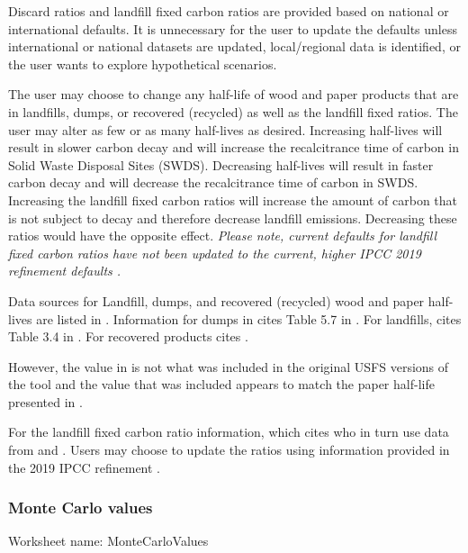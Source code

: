 \documentclass[
  openany]{book}
\begin{document}
Discard ratios and landfill fixed carbon ratios are provided based on national or international defaults. It is unnecessary for the user to update the defaults unless international or national datasets are updated, local/regional data is identified, or the user wants to explore hypothetical scenarios.

The user may choose to change any half-life of wood and paper products that are in landfills, dumps, or recovered (recycled) as well as the landfill fixed ratios. The user may alter as few or as many half-lives as desired. Increasing half-lives will result in slower carbon decay and will increase the recalcitrance time of carbon in Solid Waste Disposal Sites (SWDS). Decreasing half-lives will result in faster carbon decay and will decrease the recalcitrance time of carbon in SWDS. Increasing the landfill fixed carbon ratios will increase the amount of carbon that is not subject to decay and therefore decrease landfill emissions. Decreasing these ratios would have the opposite effect. \emph{Please note, current defaults for landfill fixed carbon ratios have not been updated to the current, higher IPCC 2019 refinement defaults \autocite{buendia2019}.}

Data sources for Landfill, dumps, and recovered (recycled) wood and paper half-lives are listed in \textcite{skog2008}. Information for dumps in \textcite{skog2008} cites Table 5.7 in \textcite{penman2000}. For landfills, \textcite{skog2008} cites Table 3.4 in \textcite{buendia2019}. For recovered products \textcite{skog2008} cites \textcite{pingoud2006}.

However, the value in \textcite{pingoud2006} is not what was included in the original USFS versions of the tool and the value that was included appears to match the paper half-life presented in \textcite{smith2006}.

For the landfill fixed carbon ratio information, \textcite{skog2008} which cites \textcite{freed2003} who in turn use data from \textcite{barlaz1998} and \textcite{eleazer1997}. Users may choose to update the ratios using information provided in the 2019 IPCC refinement \autocite{ruter2019}.

\hypertarget{own-prov-input-mc}{%
\subsubsection{Monte Carlo values}\label{own-prov-input-mc}}

Worksheet name: MonteCarloValues
\end{document}
